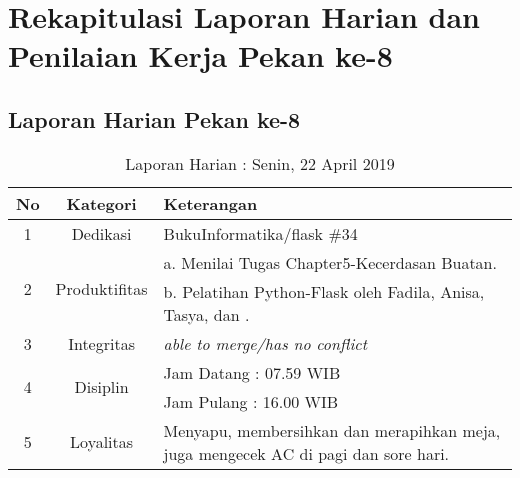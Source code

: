 \section{Rekapitulasi Laporan Harian dan Penilaian Kerja Pekan ke-8}

\subsection{Laporan Harian Pekan ke-8}

\begin{table}[htp]
\begin{center}
\caption{Laporan Harian : Senin, 22 April 2019}
\label{tab:lh220419}
\begin{tabularx}{\textwidth}{|l|l|X|}
\hline
\multicolumn{1}{|c|}{\textbf{No}} & \multicolumn{1}{c|}{\textbf{Kategori}} & \textbf{Keterangan} \\ \hline
\multicolumn{1}{|c|}{\multirow{1}{*}{1}} & \multicolumn{1}{c|}{\multirow{1}{*}{\parbox{2.5cm}{Dedikasi}}}
& BukuInformatika/flask \#34\\
\hline
\multicolumn{1}{|c|}{\multirow{2}{*}{2}} & \multicolumn{1}{c|}{\multirow{2}{*}{\parbox{2.5cm}{Produktifitas}}}
& a. Menilai Tugas Chapter5-Kecerdasan Buatan.\\
\multicolumn{1}{|c|}{\multirow{1}{*}{}} & \multicolumn{1}{c|}{\multirow{1}{*}{\parbox{2.5cm}{}}}
& b. Pelatihan Python-Flask oleh Fadila, Anisa, Tasya, dan .\\
\hline
\multicolumn{1}{|c|}{\multirow{1}{*}{3}} & \multicolumn{1}{c|}{\multirow{1}{*}{\parbox{2.5cm}{Integritas}}}
& \textit{able to merge/has no conflict} \\
\hline
\multicolumn{1}{|c|}{\multirow{2}{*}{4}} & \multicolumn{1}{c|}{\multirow{2}{*}{\parbox{2.5cm}{Disiplin}}}
& Jam Datang : 07.59 WIB \\
\multicolumn{1}{|c|}{\multirow{1}{*}{}} & \multicolumn{1}{c|}{\multirow{1}{*}{\parbox{2.5cm}{}}}
& Jam Pulang : 16.00 WIB \\
\hline
\multicolumn{1}{|c|}{\multirow{2}{*}{5}} & \multicolumn{1}{c|}{\multirow{2}{*}{\parbox{2.5cm}{Loyalitas}}}
& Menyapu, membersihkan dan merapihkan meja, juga mengecek AC di pagi dan sore hari.\\
\hline
\end{tabularx}
\end{center}
\end{table}
